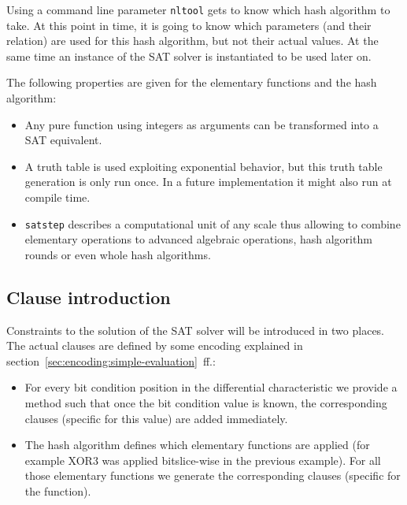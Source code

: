 Using a command line parameter \texttt{nltool} gets to know which hash algorithm to take. At this point in time, it is going to know which parameters (and their relation) are used for this hash algorithm, but not their actual values. At the same time an instance of the SAT solver is instantiated to be used later on.

The following properties are given for the elementary functions and the hash algorithm:
\begin{itemize}
  \item Any pure function using integers as arguments can be transformed into a SAT equivalent.
  \item A truth table is used exploiting exponential behavior, but this truth table generation is only run once. In a future implementation it might also run at compile time.
  \item \texttt{satstep} describes a computational unit of any scale thus allowing to combine elementary operations to advanced algebraic operations, hash algorithm rounds or even whole hash algorithms.
\end{itemize}

\subsection{Clause introduction}
\label{sec:clause-introduction}
%
Constraints to the solution of the SAT solver will be introduced in two places. The actual clauses are defined by some encoding explained in section~\ref{sec:encoding:simple-evaluation}~ff.:
\begin{itemize}
  \item For every bit condition position in the differential characteristic we provide a method such that once the bit condition value is known, the corresponding clauses (specific for this value) are added immediately.
  \item The hash algorithm defines which elementary functions are applied (for example XOR3 was applied bitslice-wise in the previous example). For all those elementary functions we generate the corresponding clauses (specific for the function).
\end{itemize}

